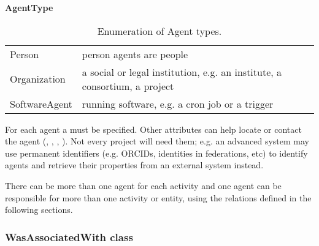 \begin{table}[ht]
\small
{}\textwidth
\textbf{\normalsize AgentType}\vspace{0.25em}\\
\begin{tabulary}{1.0\textwidth}{lp{8cm}}
\toprule
{} & \\
\midrule
Person        & person agents are people\\
Organization  & a social or legal institution, e.g. an institute, a consortium, a project\\
SoftwareAgent & running software, e.g. a cron job or a trigger \\
\bottomrule
\end{tabulary}
\caption[Enumeration of Agent types.]{Enumeration of Agent types.}
\label{tab:agent-types}
\end{table}


For each agent a  must be specified. 
Other attributes can help locate or contact the agent (, , , ).
Not every project will need them; e.g. an advanced system may use permanent identifiers (e.g. ORCIDs, identities in federations, etc) to identify agents and retrieve their properties from an external system instead.

There can be more than one agent for each activity and one agent can be responsible for more than one activity or entity, using the relations defined in the following sections.


\subsubsection{WasAssociatedWith class}

